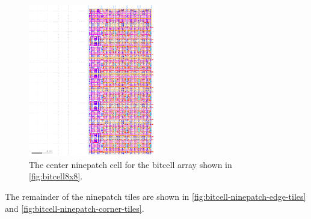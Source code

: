 \begin{figure}[H] \centering
\includegraphics[width=0.5\textwidth]{figures/bitcell_center.png}
\caption{The center ninepatch cell for the bitcell array shown in \ref{fig:bitcell8x8}. \label{fig:bitcell-center}}
\end{figure}

The remainder of the ninepatch tiles are shown in \ref{fig:bitcell-ninepatch-edge-tiles}
and \ref{fig:bitcell-ninepatch-corner-tiles}.


